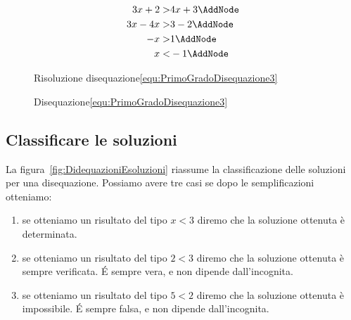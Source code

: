 \begin{figure}
	\begin{NodesList}
		\centering
		\begin{align*}
			3x+2>&4x+3\AddNode\\
			3x-4x>&3-2\AddNode\\
			-x>&1\AddNode\\
			x<&-1\AddNode
		\end{align*}
				\end{NodesList}
	\captionsetup{format=esempio,list=no}
	\caption{Risoluzione disequazione\nobs\vref{equ:PrimoGradoDisequazione3}}
	\label{fig:esempioDisequazioniPgrado3}
\end{figure}
\begin{figure}
	\centering
	\captionsetup{format=grafico,list=no}
	\caption{Disequazione\nobs\vref{equ:PrimoGradoDisequazione3}}
	\label{fig:esempioDisequazioniPgradografico3}
\end{figure}
\subsection{Classificare le soluzioni}
La figura~\vref{fig:DidequazioniEsoluzioni} riassume la classificazione delle soluzioni per una disequazione. Possiamo avere tre casi
se dopo le semplificazioni otteniamo:
\begin{enumerate}
	\item se otteniamo un risultato  del tipo $x<3$ diremo che la soluzione ottenuta è determinata.
	\item se otteniamo un risultato del tipo $2<3$ diremo che la soluzione ottenuta è sempre verificata. \'E sempre vera, e non dipende dall'incognita. 
	\item se otteniamo un risultato del tipo $5<2$ diremo che la soluzione ottenuta è impossibile. \'E sempre falsa, e non dipende dall'incognita.
\end{enumerate}

